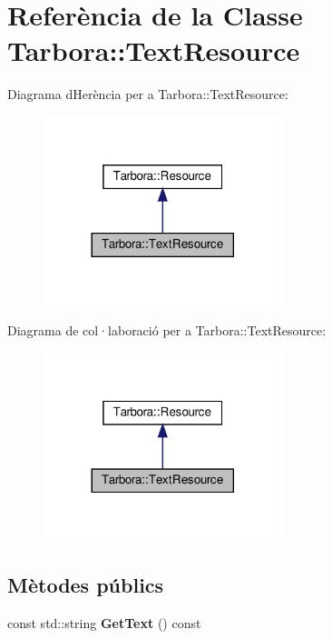 \hypertarget{classTarbora_1_1TextResource}{}\section{Referència de la Classe Tarbora\+:\+:Text\+Resource}
\label{classTarbora_1_1TextResource}


Diagrama d\textquotesingle{}Herència per a Tarbora\+:\+:Text\+Resource\+:\nopagebreak
\begin{figure}[H]
\begin{center}
\leavevmode
\includegraphics[width=197pt]{classTarbora_1_1TextResource__inherit__graph}
\end{center}
\end{figure}


Diagrama de col·laboració per a Tarbora\+:\+:Text\+Resource\+:\nopagebreak
\begin{figure}[H]
\begin{center}
\leavevmode
\includegraphics[width=197pt]{classTarbora_1_1TextResource__coll__graph}
\end{center}
\end{figure}
\subsection*{Mètodes públics}
\begin{DoxyCompactItemize}
\item 
\mbox{\label{classTarbora_1_1TextResource_a03f5db70cd7c457dd125fa9d61b38e9c}} 
const std\+::string {\bfseries Get\+Text} () const
\end{DoxyCompactItemize}
